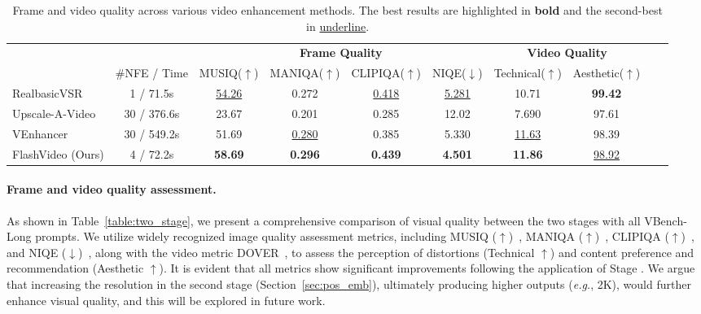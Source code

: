 \begin{table*}[!t]
\centering
\scriptsize
\setlength{\tabcolsep}{5pt}
\renewcommand{\arraystretch}{1.0}
\begin{tabular}{lccccccccc}
\toprule
&  & \multicolumn{4}{c}{\textbf{Frame Quality}} & \multicolumn{2}{c}{\textbf{Video  Quality}}  \\
\cmidrule(lr){3-6}
\cmidrule(lr){7-8}
    & \#NFE / Time &  MUSIQ($\uparrow$) & MANIQA($\uparrow$) & CLIPIQA($\uparrow$) & NIQE($\downarrow$)   &  Technical($\uparrow$)   & Aesthetic($\uparrow$)    \\
\midrule
RealbasicVSR & 1 / 71.5s & \underline{54.26}  & 0.272 &\underline{0.418} &\underline{5.281}&  10.71 & \textbf{99.42}  \\
Upscale-A-Video & 30 / 376.6s & 23.67 &0.201 & 0.285 & 12.02 & 7.690 & 97.61   \\
VEnhancer & 30 / 549.2s & 51.69  & \underline{0.280}& 0.385 &  5.330 & \underline{11.63} & 98.39   \\

FlashVideo (Ours) &  4 / 72.2s  & \textbf{58.69}    &   \textbf{0.296}   & \textbf{0.439}   &\textbf{4.501}  & \textbf{11.86}  & \underline{98.92} 


\\
\bottomrule
\end{tabular}
\caption{ Frame and video quality across various video enhancement methods.  The best results are highlighted in \textbf{bold} and the second-best in \underline{underline}. }
\label{table:com_other}
\end{table*}



\paragraph{Frame and video quality assessment.} As shown in Table~\ref{table:two_stage}, we present a comprehensive comparison of visual quality between the two stages with all VBench-Long prompts. We utilize widely recognized image quality assessment metrics, including MUSIQ ($\uparrow$)~\citep{musiq}, MANIQA ($\uparrow$)~\cite{maniqa}, CLIPIQA ($\uparrow$)~\citep{clipiqa}, and NIQE ($\downarrow$)~\citep{niqe}, along with the video metric DOVER~\citep{dover}, to assess the perception of distortions (Technical $\uparrow$) and content preference and recommendation (Aesthetic $\uparrow$). It is evident that all metrics show significant improvements following the application of Stage . We argue that increasing the resolution in the second stage (Section~\ref{sec:pos_emb}), ultimately producing higher outputs (\textit{e.g.}, 2K), would further enhance visual quality, and this will be explored in future work.





